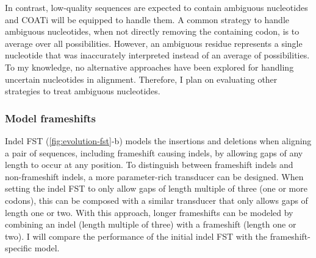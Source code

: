 In contrast, low-quality sequences are expected to contain ambiguous nucleotides
and COATi will be equipped to handle them.
A common strategy to handle ambiguous nucleotides, when not directly removing
the containing codon, is to average over all possibilities.
However, an ambiguous residue represents a single nucleotide that was
inaccurately interpreted instead of an average of possibilities.
To my knowledge, no alternative approaches have been explored for handling
uncertain nucleotides in alignment.
Therefore, I plan on evaluating other strategies to treat ambiguous nucleotides.

\subsubsection{Model frameshifts}



Indel FST (\ref{fig:evolution-fst}-b) models the insertions and deletions when
aligning a pair of sequences, including frameshift causing indels, by allowing
gaps of any length to occur at any position.
To distinguish between frameshift indels and non-frameshift indels, a more
parameter-rich transducer can be designed.
When setting the indel FST to only allow gaps of length multiple of three (one
or more codons), this can be composed with a similar transducer that only
allows gaps of length one or two.
With this approach, longer frameshifts can be modeled by combining an indel
(length multiple of three) with a frameshift (length one or two).
I will compare the performance of the initial indel FST with the frameshift-specific model.


